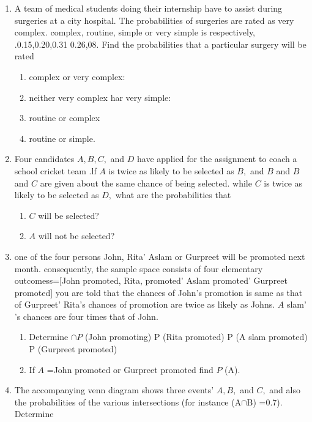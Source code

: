 \documentclass[12pt]{article}
\begin{document}
\begin{enumerate}
\begin{enumerate}
	\end{enumerate}
\item A team of medical students doing their internship have to assist during surgeries at a city hospital. The probabilities of surgeries are rated as very complex. complex, routine, simple or very simple is respectively, .0.15,0.20,0.31 0.26,08. Find the probabilities that a particular surgery will be rated
	\begin{enumerate}
\item complex or very complex:
\item neither very complex har very simple:
\item routine or complex 
\item routine or simple.
	\end{enumerate}
\item Four candidates $A, B, C,$ and $D$ have applied for the assignment to coach a school cricket team .lf $A$ is twice as likely to be selected as $B,$ and $B$ and $B$ and $C$ are given about the same chance of being selected. while $C$ is twice as likely to be selected as $D,$ what are the probabilities that
\begin{enumerate}
\item $C$ will be selected?
\item $A$ will not be selected?
\end{enumerate}
\item one of the four persons John, Rita' Aslam or Gurpreet will be promoted next month. consequently, the sample space consists of four elementary outcomess=[John promoted, Rita, promoted' Aslam promoted' Gurpreet promoted] you are told that the chances of John's promotion is same as that of Gurpreet' Rita's chances of promotion are twice as likely as Johns. $A$ slam' 's chances are four times that of John.
	\begin{enumerate}
\item Determine $\cap{P}$ (John promoting)
 P (Rita promoted)
 P (A slam promoted)
 P (Gurpreet promoted)
\item  If $A$ ={John promoted or Gurpreet promoted} find $P$ (A).
	\end{enumerate}
\item The accompanying venn diagram shows three events' $A, B,$ and $C,$ and also the probabilities of the various intersections (for instance (A$\cap$B) =0.7). Determine

\end{enumerate}
\end{document}
